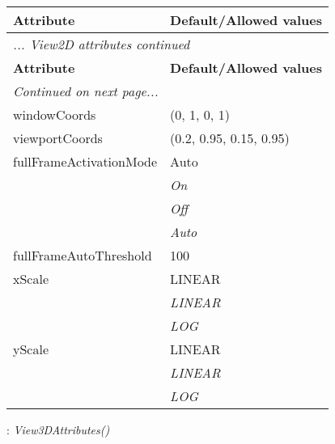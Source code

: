 \documentclass[10pt,a4paper]{report}
\begin{document}
\begin{longtable}{ll}
{\bf Attribute} & {\bf Default/Allowed values} \\
\hline \hline
\endfirsthead
\multicolumn{2}{l}{{\it ... View2D attributes continued}} \\
{\bf Attribute} & {\bf Default/Allowed values} \\
\hline \hline
\endhead
\hline
\multicolumn{2}{l}{{\it Continued on next page...}} \\
\endfoot
\hline
\endlastfoot

windowCoords  &  (0, 1, 0, 1) \\
viewportCoords  &  (0.2, 0.95, 0.15, 0.95) \\
fullFrameActivationMode  &  Auto   \\
 & {\it  On} \\
 & {\it  Off} \\
 & {\it  Auto} \\
fullFrameAutoThreshold  &  100 \\
xScale  &  LINEAR   \\
 & {\it  LINEAR} \\
 & {\it  LOG} \\
yScale  &  LINEAR   \\
 & {\it  LINEAR} \\
 & {\it  LOG} \\
\end{longtable}

\newpage

{}
: {\it View3DAttributes() }\\[-3mm]
\end{document}
